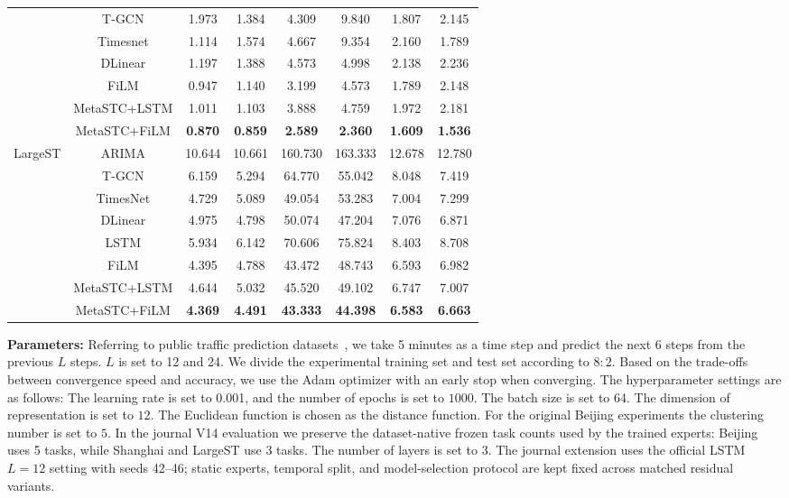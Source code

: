 \documentclass[lettersize,journal]{IEEEtran}
\begin{document}
\begin{table}[!t]
{\begin{tabular}{cccccccc}
    &T-GCN & 1.973 & 1.384 & 4.309 & 9.840 & 1.807 & 2.145 \\
    &Timesnet & 1.114 & 1.574 & 4.667 & 9.354 & 2.160 & 1.789 \\
    &DLinear & 1.197 & 1.388 & 4.573 & 4.998 & 2.138 & 2.236 \\
    &FiLM & 0.947 & 1.140 & 3.199 & 4.573 & 1.789 & 2.148 \\
    &MetaSTC+LSTM & 1.011 & 1.103 & 3.888 & 4.759 & 1.972 & 2.181  \\
    &MetaSTC+FiLM & \textbf{0.870} & \textbf{0.859} & \textbf{ 2.589} & \textbf{2.360} & \textbf{1.609}& \textbf{1.536}  \\
    
    \midrule
    LargeST & ARIMA & 10.644 & 10.661 & 160.730 & 163.333 & 12.678 & 12.780 \\
    &T-GCN & 6.159 & 5.294 & 64.770 & 55.042 & 8.048 & 7.419 \\
    &TimesNet & 4.729 & 5.089 &49.054 &53.283 &7.004 & 7.299  \\
    &DLinear & 4.975 & 4.798 & 50.074 & 47.204 & 7.076 & 6.871 \\
    &LSTM & 5.934 & 6.142 & 70.606 & 75.824 & 8.403 & 8.708\\
    & FiLM & 4.395 & 4.788 & 43.472 & 48.743 & 6.593 & 6.982  \\
    &MetaSTC+LSTM & 4.644 & 5.032 & 45.520 & 49.102 & 6.747 & 7.007  \\
    &MetaSTC+FiLM &\textbf{ 4.369} &\textbf{ 4.491} & \textbf{43.333 }& \textbf{44.398 }&\textbf{ 6.583 }& \textbf{6.663}\\
    \bottomrule  
    \end{tabular}}
\end{table}

\textbf{Parameters:}
Referring to public traffic prediction datasets~\cite{PeMSD}, we take 5 minutes as a time step and predict the next $6$ steps from the previous $L$ steps. $L$ is set to 12 and 24. We divide the experimental training set and test set according to $8:2$. Based on the trade-offs between convergence speed and accuracy, we use the Adam optimizer with an early stop when converging. The hyperparameter settings are as follows: The learning rate is set to 0.001, and the number of epochs is set to $1000$. The batch size is set to 64. The dimension of representation is set to $12$. The Euclidean function is chosen as the distance function. For the original Beijing experiments the clustering number is set to $5$. In the journal V14 evaluation we preserve the dataset-native frozen task counts used by the trained experts: Beijing uses 5 tasks, while Shanghai and LargeST use 3 tasks. The number of layers is set to $3$. The journal extension uses the official LSTM $L=12$ setting with seeds 42--46; static experts, temporal split, and model-selection protocol are kept fixed across matched residual variants. 
\end{document}
